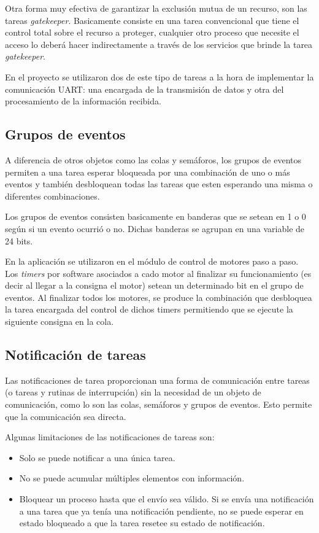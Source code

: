 \documentclass{IEEEtran}
\begin{document}
Otra forma muy efectiva de garantizar la exclusión mutua de un recurso, son las tareas \textit{gatekeeper}. Basicamente consiste en una tarea convencional que tiene el control total sobre el recurso a proteger, cualquier otro proceso que necesite el acceso lo deberá hacer indirectamente a través de los servicios que brinde la tarea \textit{gatekeeper}. 

En el proyecto se utilizaron dos de este tipo de tareas a la hora de implementar la comunicación UART: una encargada de la transmisión de datos y otra del procesamiento de la información recibida.

\subsection{Grupos de eventos}
A diferencia de otros objetos como las colas y semáforos, los grupos de eventos permiten a una tarea esperar bloqueada por una combinación de uno o más eventos y también desbloquean todas las tareas que esten esperando una misma o diferentes combinaciones.

Los grupos de eventos consisten basicamente en banderas que se setean en 1 o 0 según si un evento ocurrió o no. Dichas banderas se agrupan en una variable de 24 bits.

En la aplicación se utilizaron en el módulo de control de motores paso a paso. Los \textit{timers} por software asociados a cado motor al finalizar su funcionamiento (es decir al llegar a la consigna el motor) setean un determinado bit en el grupo de eventos. Al finalizar todos los motores, se produce la combinación que desbloquea la tarea encargada del control de dichos timers permitiendo que se ejecute la siguiente consigna en la cola.

\subsection{Notificación de tareas}
Las notificaciones de tarea proporcionan una forma de comunicación entre tareas (o tareas y rutinas de interrupción) sin la necesidad de un objeto de comunicación, como lo son las colas, semáforos y grupos de eventos. Esto permite que la comunicación sea directa.

Algunas limitaciones de las notificaciones de tareas son:

\begin{itemize}
    \item Solo se puede notificar a una única tarea.
    \item No se puede acumular múltiples elementos con información.
    \item Bloquear un proceso hasta que el envío sea válido. Si se envía una notificación a una tarea que ya tenía una notificación pendiente, no se puede esperar en estado bloqueado a que la tarea resetee su estado de notificación.
\end{itemize}
\end{document}
